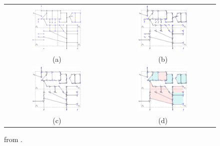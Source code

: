  \begin{figure}
     \centering
     \begin{tabular}{cc}
         \includegraphics[width=0.49\textwidth]{chapterExtension/model/input/input} &
         \includegraphics[width=0.49\textwidth]{chapterExtension/model/a/a} \\
         (a) & (b) \\
         \includegraphics[width=0.49\textwidth]{chapterExtension/model/b/b} &
         \includegraphics[width=0.49\textwidth]{chapterExtension/model/c/c} \\
         (c) & (d) \\
     \end{tabular}
     \caption{from \cite{abdelhafeez_ddcel_2023}.} \label{fig:polygonization}
 \end{figure}
